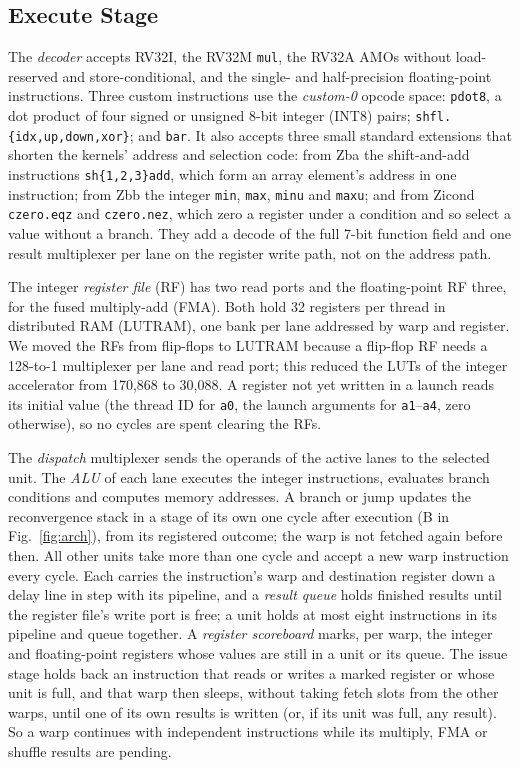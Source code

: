 \documentclass[journal]{IEEEtran}
\begin{document}
\subsection{Execute Stage}
The \emph{decoder} accepts RV32I, the RV32M \texttt{mul}, the RV32A AMOs without
load-reserved and store-conditional, and the single- and half-precision
floating-point instructions. Three custom instructions use the \emph{custom-0}
opcode space: \texttt{pdot8}, a dot product of four signed or unsigned 8-bit
integer (INT8) pairs; \texttt{shfl.\{idx,up,down,xor\}}; and \texttt{bar}. It
also accepts three small standard extensions that shorten the kernels' address
and selection code: from Zba the shift-and-add instructions
\texttt{sh\{1,2,3\}add}, which form an array element's address in one instruction;
from Zbb the integer \texttt{min}, \texttt{max}, \texttt{minu} and \texttt{maxu};
and from Zicond \texttt{czero.eqz} and \texttt{czero.nez}, which zero a register
under a condition and so select a value without a branch. They add a decode of
the full 7-bit function field and one result multiplexer per lane on the register
write path, not on the address path.

The integer \emph{register file} (RF) has two read ports and the floating-point RF
three, for the fused multiply-add (FMA). Both hold 32 registers per thread in
distributed RAM (LUTRAM), one bank per lane addressed by warp and register. We
moved the RFs from flip-flops to LUTRAM because a flip-flop RF needs a 128-to-1
multiplexer per lane and read port; this reduced the LUTs of the integer
accelerator from 170,868 to 30,088. A register not yet written in a launch reads
its initial value (the thread ID for \texttt{a0}, the launch arguments for
\texttt{a1}--\texttt{a4}, zero otherwise), so no cycles are spent clearing the RFs.

The \emph{dispatch} multiplexer sends the operands of the active lanes to the
selected unit. The \emph{ALU} of each lane executes the integer instructions,
evaluates branch conditions and computes memory addresses. A branch or jump
updates the reconvergence stack in a stage of its own one cycle after execution
(B in Fig.~\ref{fig:arch}), from its registered outcome; the warp is not fetched
again before then. All other units take more than one cycle and accept a new warp
instruction every cycle. Each carries the instruction's warp and destination
register down a delay line in step with its pipeline, and a \emph{result queue}
holds finished results until the register file's write port is free; a unit
holds at most eight instructions in its pipeline and queue together. A \emph{register scoreboard} marks, per warp, the integer and
floating-point registers whose values are still in a unit or its queue. The
issue stage holds back an instruction that reads or writes a marked register or
whose unit is full, and that warp then sleeps, without taking fetch slots from
the other warps, until one of its own results is written (or, if its unit was
full, any result). So a warp continues with independent instructions while its
multiply, FMA or shuffle results are pending.
\end{document}
